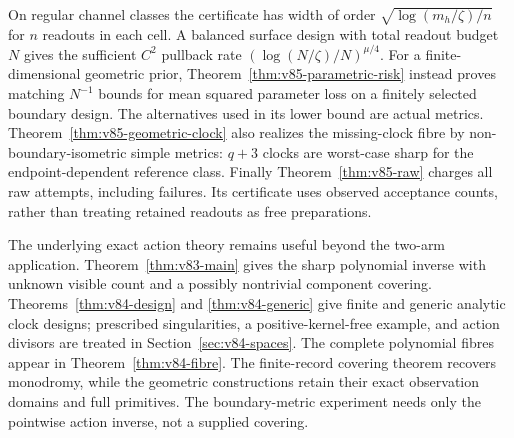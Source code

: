 On regular channel classes the certificate has width of order
$\sqrt{\log(m_h/\zeta)/n}$ for $n$ readouts in each cell. A balanced
surface design with total readout budget $N$ gives the sufficient
$C^2$ pullback rate $(\log(N/\zeta)/N)^{\mu/4}$.
For a finite-dimensional geometric prior, Theorem~\ref{thm:v85-parametric-risk}
instead proves matching $N^{-1}$ bounds for mean squared parameter
loss on a finitely selected boundary design. The alternatives used in
its lower bound are actual metrics. Theorem~\ref{thm:v85-geometric-clock}
also realizes the missing-clock fibre by non-boundary-isometric simple
metrics: $q+3$ clocks are worst-case sharp for the endpoint-dependent
reference class. Finally Theorem~\ref{thm:v85-raw} charges all raw
attempts, including failures. Its certificate uses observed acceptance
counts, rather than treating retained readouts as free preparations.

The underlying exact action theory remains useful beyond the two-arm
application. Theorem~\ref{thm:v83-main} gives the sharp polynomial
inverse with unknown visible count and a possibly nontrivial component
covering. Theorems~\ref{thm:v84-design} and \ref{thm:v84-generic} give
finite and generic analytic clock designs; prescribed singularities,
a positive-kernel-free example, and action divisors are treated in
Section~\ref{sec:v84-spaces}. The complete polynomial fibres appear in
Theorem~\ref{thm:v84-fibre}. The finite-record covering theorem recovers
monodromy, while the geometric constructions retain their exact
observation domains and full primitives. The boundary-metric experiment
needs only the pointwise action inverse, not a supplied covering.

